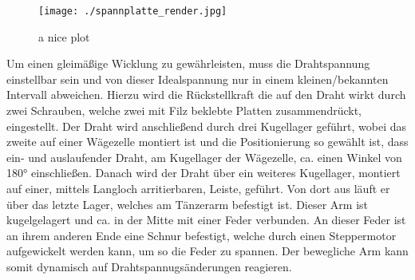 \begin{figure}[H]
    \centering
    \texttt{[image: ./spannplatte\_render.jpg]}
    \caption{a nice plot}
    \label{fig:winder_render}
\end{figure}
Um einen gleimäßige Wicklung zu gewährleisten, muss die Drahtspannung einstellbar sein und von dieser Idealspannung nur in einem kleinen/bekannten Intervall abweichen. Hierzu wird die Rückstellkraft die auf den Draht wirkt durch zwei Schrauben, welche zwei mit Filz beklebte Platten zusammendrückt, eingestellt. Der Draht wird anschließend durch drei Kugellager geführt, wobei das zweite auf einer Wägezelle montiert ist und die Positionierung so gewählt ist, dass ein- und auslaufender Draht, am Kugellager der Wägezelle, ca. einen Winkel von 180° einschließen. Danach wird der Draht über ein weiteres Kugellager, montiert auf einer, mittels Langloch arritierbaren, Leiste, geführt. Von dort aus läuft er über das letzte Lager, welches am Tänzerarm befestigt ist. Dieser Arm ist kugelgelagert und ca. in der Mitte mit einer Feder verbunden. An dieser Feder ist an ihrem anderen Ende eine Schnur befestigt, welche durch einen Steppermotor aufgewickelt werden kann, um so die Feder zu spannen. Der bewegliche Arm kann somit dynamisch auf Drahtspannugsänderungen reagieren.
